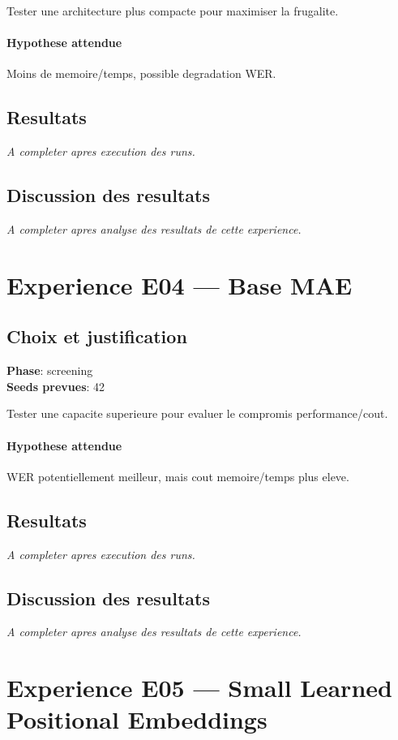 \documentclass[11pt,a4paper]{article}
\begin{document}
Tester une architecture plus compacte pour maximiser la frugalite.

\paragraph{Hypothese attendue}
Moins de memoire/temps, possible degradation WER.

\subsection{Resultats}
\textit{A completer apres execution des runs.}

\subsection{Discussion des resultats}
\textit{A completer apres analyse des resultats de cette experience.}


\section{Experience E04 --- Base MAE}
\subsection{Choix et justification}
\textbf{Phase}: screening\\
\textbf{Seeds prevues}: 42

Tester une capacite superieure pour evaluer le compromis performance/cout.

\paragraph{Hypothese attendue}
WER potentiellement meilleur, mais cout memoire/temps plus eleve.

\subsection{Resultats}
\textit{A completer apres execution des runs.}

\subsection{Discussion des resultats}
\textit{A completer apres analyse des resultats de cette experience.}


\section{Experience E05 --- Small Learned Positional Embeddings}
\end{document}
